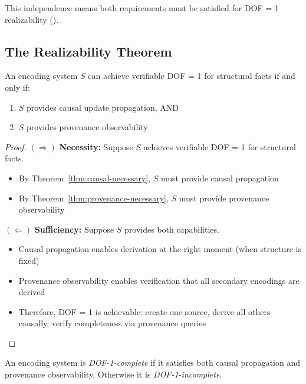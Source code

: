 This independence means both requirements must be satisfied for DOF = 1 realizability ().

\subsection{The Realizability Theorem}\label{sec:realizability-theorem}

\begin{theorem}\label{thm:ssot-iff}
An encoding system $S$ can achieve verifiable DOF = 1 for structural facts if and only if:
\begin{enumerate}
\tightlist
\item $S$ provides causal update propagation, AND
\item $S$ provides provenance observability
\end{enumerate}
\end{theorem}

\begin{proof}
$(\Rightarrow)$ \textbf{Necessity:} Suppose $S$ achieves verifiable DOF = 1 for structural facts.
\begin{itemize}
\tightlist
\item By Theorem~\ref{thm:causal-necessary}, $S$ must provide causal propagation
\item By Theorem~\ref{thm:provenance-necessary}, $S$ must provide provenance observability
\end{itemize}

$(\Leftarrow)$ \textbf{Sufficiency:} Suppose $S$ provides both capabilities.
\begin{itemize}
\tightlist
\item Causal propagation enables derivation at the right moment (when structure is fixed)
\item Provenance observability enables verification that all secondary encodings are derived
\item Therefore, DOF = 1 is achievable: create one source, derive all others causally, verify completeness via provenance queries
\end{itemize}
\end{proof}

\begin{definition}\label{def:dof-complete}
An encoding system is \emph{DOF-1-complete} if it satisfies both causal propagation and provenance observability. Otherwise it is \emph{DOF-1-incomplete}.
\end{definition}

